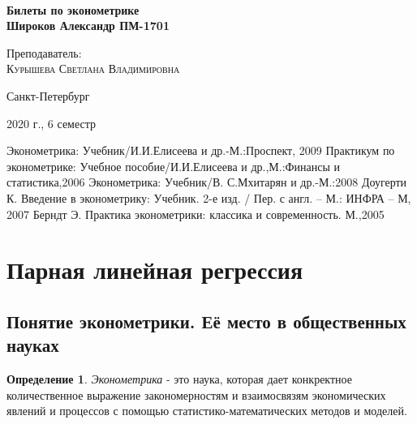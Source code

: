 \documentclass[aps,%
12pt,%
final,%
oneside,
onecolumn,%
musixtex, %
superscriptaddress,%
centertags]{article} %
\theoremstyle{plain}
\theoremstyle{definition}
\newtheorem{definition}{Определение}[subsection]
\theoremstyle{remark}
\begin{document}
\begin{titlepage} 
\begin{center}
 
\textbf{}\\[10.0cm]
\textbf{\LARGE Билеты по эконометрике}\\[0.5cm]
\textbf{\Large Широков Александр ПМ-1701} \\[0.2cm]

\begin{center} \large
{Преподаватель:} \\[0.5cm]
\textsc {Курышева Светлана Владимировна}\\
\end{center}
\vfill 

{\large {Санкт-Петербург}} \par
{\large {2020 г., 6 семестр}}
\end{center} 
\end{titlepage}

\begin{thebibliography}{3}
Эконометрика: Учебник/И.И.Елисеева и др.-М.:Проспект, 2009
Практикум по эконометрике: Учебное пособие/И.И.Елисеева и др.,М.:Финансы и статистика,2006 
Эконометрика: Учебник/В. С.Мхитарян и др.-М.:2008
Доугерти К. Введение в эконометрику: Учебник. 2-е изд. / Пер. с англ. – М.: ИНФРА – М, 2007
Берндт Э. Практика эконометрики: классика и современность. М.,2005
\end{thebibliography}
\tableofcontents
\newpage


\section{Парная линейная регрессия}

\subsection{Понятие эконометрики. Её место в общественных науках}

\begin{definition}
	\textit{Эконометрика} - это наука, которая дает конкректное количественное выражение закономерностям и взаимосвязям экономических явлений и процессов с помощью статистико-математических методов и моделей.
\end{definition}
\end{document}
